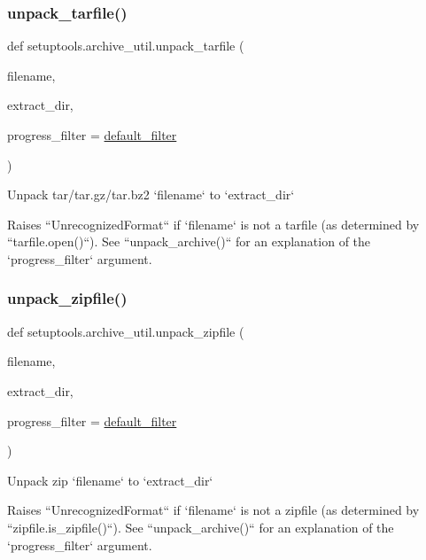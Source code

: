 \subsubsection{\texorpdfstring{unpack\+\_\+tarfile()}{unpack\_tarfile()}}
{\footnotesize\ttfamily def setuptools.\+archive\+\_\+util.\+unpack\+\_\+tarfile (\begin{DoxyParamCaption}\item[{}]{filename,  }\item[{}]{extract\+\_\+dir,  }\item[{}]{progress\+\_\+filter = {\ttfamily \hyperlink{namespacesetuptools_1_1archive__util_adede8e93e57be04915ea0d27831b654b}{default\+\_\+filter}} }\end{DoxyParamCaption})}

\begin{DoxyVerb}Unpack tar/tar.gz/tar.bz2 `filename` to `extract_dir`

Raises ``UnrecognizedFormat`` if `filename` is not a tarfile (as determined
by ``tarfile.open()``).  See ``unpack_archive()`` for an explanation
of the `progress_filter` argument.
\end{DoxyVerb}
 \mbox{\label{namespacesetuptools_1_1archive__util_a01c6de8920234e1bcb47befda68d40c4}} 
\subsubsection{\texorpdfstring{unpack\+\_\+zipfile()}{unpack\_zipfile()}}
{\footnotesize\ttfamily def setuptools.\+archive\+\_\+util.\+unpack\+\_\+zipfile (\begin{DoxyParamCaption}\item[{}]{filename,  }\item[{}]{extract\+\_\+dir,  }\item[{}]{progress\+\_\+filter = {\ttfamily \hyperlink{namespacesetuptools_1_1archive__util_adede8e93e57be04915ea0d27831b654b}{default\+\_\+filter}} }\end{DoxyParamCaption})}

\begin{DoxyVerb}Unpack zip `filename` to `extract_dir`

Raises ``UnrecognizedFormat`` if `filename` is not a zipfile (as determined
by ``zipfile.is_zipfile()``).  See ``unpack_archive()`` for an explanation
of the `progress_filter` argument.
\end{DoxyVerb}
 

